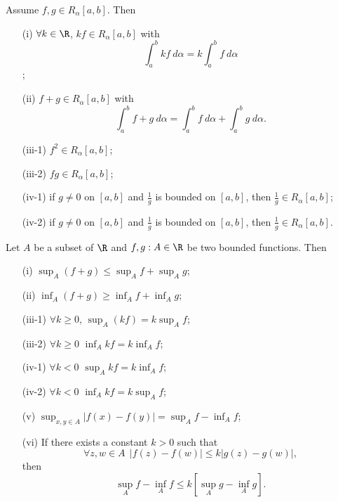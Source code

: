 \begin{theorem}
    Assume \( f,g \in {R}_{\alpha}[a,b] \). Then
    \begin{enumerate}
        \item[(i)] \( \forall k \in \R  \), \( kf \in {R}_{\alpha}[a,b] \) with \[ \int_{ a }^{ b }  kf  \ d \alpha = k \int_{ a }^{ b }  f  \ d \alpha \];
        \item[(ii)] \( f + g \in {R}_{\alpha}[a,b] \) with 
            \[  \int_{ a }^{ b }  f + g  \ d \alpha = \int_{ a }^{ b }  f  \ d \alpha  + \int_{ a }^{ b }  g  \ d \alpha. \]
        \item[(iii-1)]  \( f^{2} \in {R}_{\alpha}[a,b] \);
        \item[(iii-2)] \( fg \in {R}_{\alpha}[a,b] \);
        \item[(iv-1)] if \( g \neq 0  \) on \( [a,b] \) and \( \frac{ 1 }{ g }  \) is bounded on \( [a,b] \), then \( \frac{ 1 }{ g }  \in {R}_{\alpha}[a,b] \);
        \item[(iv-2)] if \( g \neq 0  \) on \( [a,b] \) and \( \frac{ 1 }{ g }   \) is bounded on \( [a,b] \), then \( \frac{ 1 }{ g }  \in {R}_{\alpha}[a,b] \).
    \end{enumerate}
\end{theorem}

\begin{lemma}[lemma 3]\label{lemma 3}
   Let \( A  \) be a subset of \( \R  \) and \( f,g : A \in \R  \) be two bounded functions. Then 
   \begin{enumerate}
       \item[(i)] \( \sup_{A} (f+g) \leq \sup_{A} f + \sup_{A} g \);
       \item[(ii)] \( \inf_{A} (f+g) \geq \inf_{A} f + \inf_{A} g  \);
       \item[(iii-1)] \( \forall k \geq 0  \), \( \sup_{A} (kf) = k \sup_{A} f \);
       \item[(iii-2)] \(  \forall k \geq 0  \) \( \inf_{A} kf = k \inf_{A} f \);
       \item[(iv-1)] \( \forall k < 0  \) \( \sup_{A} kf = k \inf_{A} f \); 
       \item[(iv-2)] \( \forall k < 0  \) \( \inf_{A} kf = k \sup_{A} f \);
       \item[(v)] \( \sup_{x,y \in A}| f(x) - f(y) | = \sup_{A} f - \inf_{A} f \);
        \item[(vi)] If there exists a constant \( k > 0  \) such that 
            \[  \forall z,w \in A \ \ | f(z) - f(w)  | \leq k | g(z) - g(w) |,  \]
            then
            \[  \sup_{A} f - \inf_{A} f \leq k [\sup_{A} g - \inf_{A}  g].  \]
   \end{enumerate}  
\end{lemma}

